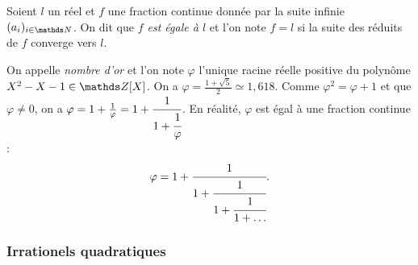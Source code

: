 \begin{definition}
	Soient $l$ un réel et $f$ une fraction continue donnée par la suite infinie
	$(a_i)_{i\in \N}$. On dit que \emph{$f$ est égale à $l$} et l'on note $f =
	l$ si la suite des réduits de $f$ converge vers $l$.
\end{definition}

\begin{exemple}[Nombre d'or]
	On appelle \emph{nombre d'or} et l'on note $\varphi$ l'unique racine réelle
	positive du polynôme $X^2 - X - 1 \in \Z[X]$. On a $\varphi =\frac{1 +
	\sqrt{5}}{2} \simeq 1, 618$. Comme $\varphi^2 = \varphi + 1$ et que
	$\varphi \neq 0$, on a $\varphi = 1 + \frac{1}{\varphi} = 1 + \cfrac{1}{1 +
	\cfrac{1}{\varphi}}$. En réalité, $\varphi$ est égal à une fraction
	continue : \[\varphi = 1 + \cfrac{1}{1 + \cfrac{1}{1 + \cfrac{1}{1 +
	\dots}}}.\]
\end{exemple}

\subsubsection{Irrationels quadratiques}

